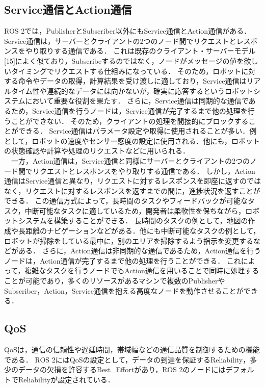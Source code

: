 \subsection{Service通信とAction通信}
ROS 2では，PublisherとSubscriber以外にもService通信とAction通信がある．
Service通信は，サーバーとクライアントの2つのノード間でリクエストとレスポンスをやり取りする通信である．
これは既存のクライアント・サーバーモデル[15]によく似ており，Subscribeするのではなく，ノードがメッセージの値を欲しいタイミングでリクエストする仕組みになっている．
そのため，ロボットに対する命令やデータの取得，計算結果を受け渡しに適しており，Service通信はリアルタイム性や連続的なデータには向かないが，確実に応答するというロボットシステムにおいて重要な役割を果たす．
さらに，Service通信は同期的な通信であるため，Service通信を行うノードは，Service通信が完了するまで他の処理を行うことができない．
そのため，クライアントの処理を間接的にブロックすることができる．
Service通信はパラメータ設定や取得に使用されることが多い．例として，ロボットの速度やセンサー感度の設定に使用される．他にも，ロボットの状態確認や計算や処理のリクエストなどに用いられる．
\\　一方，Action通信は，Service通信と同様にサーバーとクライアントの2つのノード間でリクエストとレスポンスをやり取りする通信である．
しかし，Action通信はService通信と異なり，リクエストに対するレスポンスを即座に返すのではなく，リクエストに対するレスポンスを返すまでの間に，進捗状況を返すことができる．
この通信方式によって，長時間のタスクやフィードバックが可能なタスク，中断可能なタスクに適しているため，開発者は柔軟性を保ちながら，ロボットシステムを構築することができる．
長時間のタスクの例として，地図の作成や長距離のナビゲーションなどがある．他にも中断可能なタスクの例として，ロボットが掃除をしている最中に，別のエリアを掃除するよう指示を変更するなどがある．
さらに，Action通信は非同期的な通信であるため，Action通信を行うノードは，Action通信が完了するまで他の処理を行うことができる．
これによって，複雑なタスクを行うノードでもAction通信を用いることで同時に処理することが可能であり，多くのリソースがあるマシンで複数のPublisherやSubscriber，Action，Service通信を抱える高度なノードを動作させることができる．
\subsection{QoS}
 QoSは，通信の信頼性や遅延時間，帯域幅などの通信品質を制御するための機能である．
 ROS 2にはQoSの設定として，データの到達を保証するReliability，多少のデータの欠損を許容するBest\_Effortがあり，ROS 2のノードにはデフォルトでReliabilityが設定されている．


